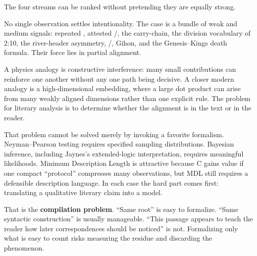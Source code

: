 The four streams can be ranked without pretending they are equally strong.


No single observation settles intentionality. The case is a bundle of weak and medium signals: repeated , attested /, the carry-chain, the division vocabulary of 2:10, the river-header asymmetry, /, Gihon, and the Genesis--Kings death formula. Their force lies in partial alignment.

A physics analogy is constructive interference: many small contributions can reinforce one another without any one path being decisive.\cite{FeynmanHibbs1965} A closer modern analogy is a high-dimensional embedding, where a large dot product can arise from many weakly aligned dimensions rather than one explicit rule. The problem for literary analysis is to determine whether the alignment is in the text or in the reader.

That problem cannot be solved merely by invoking a favorite formalism. Neyman--Pearson testing requires specified sampling distributions.\cite{NeymanPearson1933} Bayesian inference, including Jaynes's extended-logic interpretation, requires meaningful likelihoods.\cite{Jaynes2003} Minimum Description Length is attractive because C gains value if one compact ``protocol'' compresses many observations, but MDL still requires a defensible description language.\cite{Rissanen1978} In each case the hard part comes first: translating a qualitative literary claim into a model.

That is the \textbf{compilation problem}. ``Same root'' is easy to formalize. ``Same syntactic construction'' is usually manageable. ``This passage appears to teach the reader how later correspondences should be noticed'' is not. Formalizing only what is easy to count risks measuring the residue and discarding the phenomenon.

